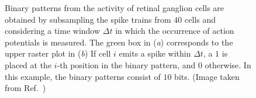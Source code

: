 \documentclass[11pt,letterpaper]{article}
\begin{document}
		\begin{figure}[t]
			\centering
			\caption{
			    Binary patterns from the activity of retinal ganglion cells are
			    obtained by subsampling the spike trains from $40$ cells
			    and considering a time window $\Delta t$ in which the occurrence
			    of action potentials is measured.
			    The green box in (\emph{a}) corresponds to the upper raster plot
			    in (\emph{b})
			    If cell $i$ emits a spike within $\Delta t$, a $1$ is placed
			    at the $i$-th position in the binary pattern, and $0$
			    otherwise.
			    In this example, the binary patterns consist of $10$ bits.
			    (Image taken from Ref.~\cite{schneidman2006weak})
			}
			\label{fig2}
		\end{figure}     
        
\end{document}
